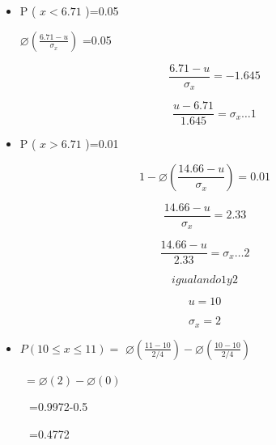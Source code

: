 \documentclass[10pt,a4paper]{article}
\begin{document}
\begin{flushleft}
\begin{justify}
\begin{multicols}{2}
	
	\vspace{\baselineskip}
	\begin{itemize}
		\item P ( \( x<6.71 \) )=0.05\par
		
		\(  \varnothing  \left( \frac{6.71-u}{ \sigma _{x}} \right)  \) =0.05\par
		
		\[  \]  \[ \frac{6.71-u}{ \sigma _{x}}=-1.645 \] \par
		
		\[  \]  \[ \frac{u-6.71}{1.645}= \sigma _{x} \ldots 1 \] \par
		
		\item P ( \( x>6.71 \) )=0.01
	\end{itemize}\par
	
	
	\vspace{\baselineskip} \[  \]  \[ 1- \varnothing  \left( \frac{14.66-u}{ \sigma _{x}} \right) =0.01 \] \par
	
	\[  \]  \[ \frac{14.66-u}{ \sigma _{x}}=2.33 \] \par
	
	\[  \]  \[ \frac{14.66-u}{2.33}= \sigma _{x} \ldots 2 \] \par
	
	\[  \]  \[ igualando 1 y 2 \] \par
	
	\[  \]  \[ u=10 \] \par
	
	\[  \]  \[  \sigma _{x}=2 \] \par
	
	
	\vspace{\baselineskip}\begin{itemize}
		\item  \( P \left( 10 \leq x \leq 11 \right) = \)   \(  \varnothing  \left( \frac{11-10}{2/4} \right) - \varnothing  \left( \frac{10-10}{2/4} \right)  \) 
	\end{itemize}\par
	
	\tabto{1.48in} \tab \ \ \ \   \( = \varnothing  \left( 2 \right) - \varnothing  \left( 0 \right)  \) \par
	
	\tabto{1.48in} \tab \ \ \ \ \  =0.9972-0.5\par
	
	\tabto{1.48in} \tab \ \ \ \ \  =0.4772\par
	

\end{multicols}
\end{justify}
\end{flushleft}
\end{document}
